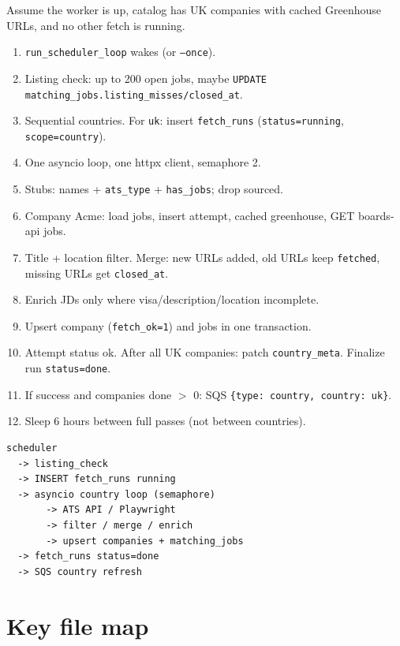 \documentclass[11pt,a4paper]{article}
\begin{document}
Assume the worker is up, catalog has UK companies with cached Greenhouse
URLs, and no other fetch is running.

\begin{enumerate}
  \item \texttt{run\_scheduler\_loop} wakes (or \texttt{--once}).
  \item Listing check: up to 200 open jobs, maybe
        \texttt{UPDATE matching\_jobs.listing\_misses/closed\_at}.
  \item Sequential countries. For \texttt{uk}: insert
        \texttt{fetch\_runs} (\texttt{status=running}, \texttt{scope=country}).
  \item One asyncio loop, one httpx client, semaphore 2.
  \item Stubs: names + \texttt{ats\_type} + \texttt{has\_jobs}; drop sourced.
  \item Company Acme: load jobs, insert attempt, cached greenhouse, GET
        boards-api jobs.
  \item Title + location filter. Merge: new URLs added, old URLs keep
        \texttt{fetched}, missing URLs get \texttt{closed\_at}.
  \item Enrich JDs only where visa/description/location incomplete.
  \item Upsert company (\texttt{fetch\_ok=1}) and jobs in one transaction.
  \item Attempt status ok. After all UK companies: patch
        \texttt{country\_meta}. Finalize run \texttt{status=done}.
  \item If success and companies done $>$ 0: SQS
        \texttt{\{type: country, country: uk\}}.
  \item Sleep 6 hours between full passes (not between countries).
\end{enumerate}

\begin{lstlisting}
scheduler
  -> listing_check
  -> INSERT fetch_runs running
  -> asyncio country loop (semaphore)
       -> ATS API / Playwright
       -> filter / merge / enrich
       -> upsert companies + matching_jobs
  -> fetch_runs status=done
  -> SQS country refresh
\end{lstlisting}

\section{Key file map}
\end{document}
